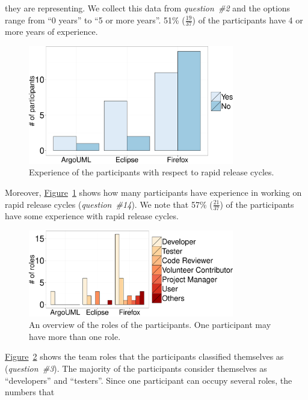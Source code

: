 they are representing. We collect this data from {\em question~\#2} and the
options range from ``0 years'' to ``5 or more years''. 51\%  ($\frac{19}{37}$)
of the participants have 4 or more years of experience. 
\begin{figure}
	\centering
	\includegraphics[width=0.80\textwidth,keepaspectratio] 
	{chapters/chapter5/figures/demographic_rapid_releases.pdf}
	\caption{Experience of the participants with respect to rapid release
	cycles.}
	\label{fig:demographics_rapid_releases}
\end{figure}
Moreover,
\hyperref[fig:demographics_rapid_releases]{Figure}~\ref{fig:demographics_rapid_releases}
shows how many participants have experience in working on rapid release cycles
({\em question~\#14}). We note that 57\% ($\frac{21}{37}$) of the participants
have some experience with rapid release cycles.
\begin{figure}
	\centering
	\includegraphics[width=0.80\textwidth,keepaspectratio] 
	{chapters/chapter5/figures/roles_demographics.pdf}
	\caption{An overview of the roles of the participants. One participant
	may have more than one role.}
	\label{fig:roles_demographics}
\end{figure}
\hyperref[fig:roles_demographics]{Figure}~\ref{fig:roles_demographics} shows the
team roles that the participants classified themselves as ({\em question~\#3}).
The majority of the participants consider themselves as ``developers'' and
``testers''. Since one participant can occupy several roles, the numbers that
